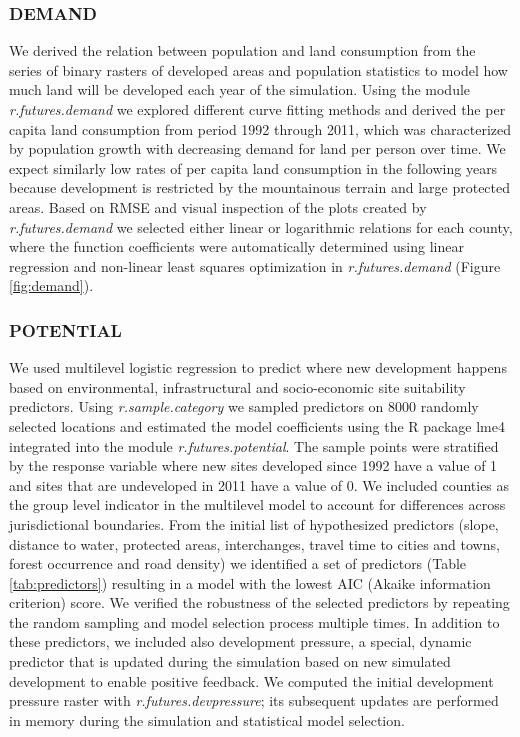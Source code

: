 \documentclass{isprs}
\begin{document}
\subsubsection{DEMAND}
We derived the relation between population
and land consumption
from the series of binary rasters of developed areas and
population statistics
to model how much land will be developed
each year of the simulation.
Using the module \emph{r.futures.demand} we explored different curve fitting
methods and derived the per capita land consumption
from period 1992 through 2011, which was characterized by
population growth with decreasing demand for land per person over time.
We expect similarly low rates of per capita land consumption
in the following years because development is restricted by the mountainous terrain and
large protected areas.
Based on RMSE and visual inspection of the plots
created by \emph{r.futures.demand} we
selected either linear or logarithmic relations %
for each county, where the function coefficients were  automatically determined using linear regression and non-linear least squares optimization 
in \emph{r.futures.demand} (Figure \ref{fig:demand}).

\subsubsection{POTENTIAL}
We used multilevel logistic regression to predict
where new development happens based on
environmental, infrastructural and socio-economic site suitability
predictors. 
Using \emph{r.sample.category} we sampled predictors on 8000 
randomly selected locations and estimated the model coefficients
using the R package lme4 integrated into the module \emph{r.futures.potential}.
The sample points were stratified by the response variable
where new sites developed since 1992 have a value of 1
and sites that are undeveloped in 2011 have a value of 0.
We included counties as the group level indicator
in the multilevel model to account for differences
across jurisdictional boundaries.
From the initial list of hypothesized predictors
(slope, distance to water, protected areas, interchanges,
travel time to cities and towns, forest occurrence and road density)
we identified a set of predictors (Table \ref{tab:predictors})
resulting in a model with the lowest AIC (Akaike information criterion) score.
We verified the robustness of the selected predictors
by repeating the random sampling and model selection process multiple times.
In addition to these predictors, we included also development pressure,
 a special, dynamic predictor that is
 updated during the simulation based on new simulated development to enable positive feedback.
We computed the initial development pressure raster
with \emph{r.futures.devpressure}; its subsequent updates are performed in memory during the simulation
and statistical model selection.
\end{document}
